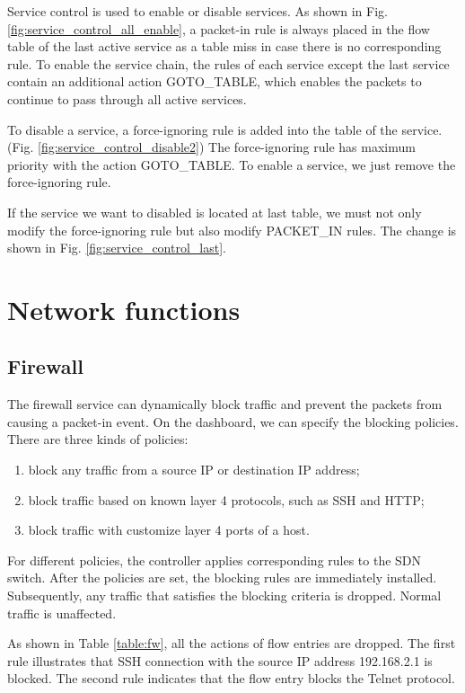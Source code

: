 Service control is used to enable or disable services.
As shown in Fig. \ref{fig:service_control_all_enable}, a packet-in rule is always placed in the flow table of the last active service as a table miss in case there is no corresponding rule.
To enable the service chain, the rules of each service except the last service contain an additional action GOTO\_TABLE, which enables the packets to continue to pass through all active services.

To disable a service, a force-ignoring rule is added into the table of the service. (Fig. \ref{fig:service_control_disable2})
The force-ignoring rule has maximum priority with the action GOTO\_TABLE.
To enable a service, we just remove the force-ignoring rule.

If the service we want to disabled is located at last table, we must not only modify the force-ignoring rule but also modify PACKET\_IN rules.
The change is shown in Fig. \ref{fig:service_control_last}.


\section{Network functions} \label{sec:setwork_functions}
\subsection{Firewall}
The firewall service can dynamically block traffic and prevent the packets from causing a packet-in event.
On the dashboard, we can specify the blocking policies. There are three kinds of policies:
\begin{enumerate}[leftmargin=4em]
  \item block any traffic from a source IP or destination IP address;
  \item block traffic based on known layer 4 protocols, such as SSH and HTTP;
  \item block traffic with customize layer 4 ports of a host.
\end{enumerate}

For different policies, the controller applies corresponding rules to the SDN switch. After the policies are set, the blocking rules are immediately installed. Subsequently, any traffic that satisfies the blocking criteria is dropped. Normal traffic is unaffected.

As shown in Table \ref{table:fw}, all the actions of flow entries are dropped. The first rule illustrates that SSH connection with the source IP address 192.168.2.1 is blocked. The second rule indicates that the flow entry blocks the Telnet protocol.

